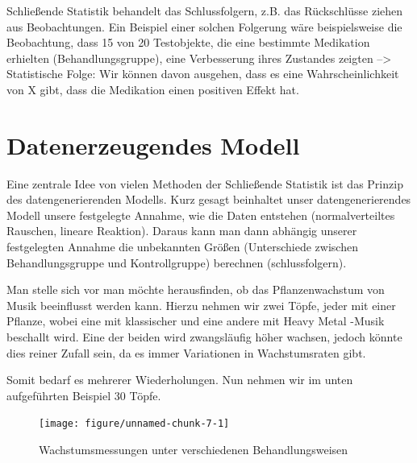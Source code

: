 \documentclass[a4paper,twoside]{tufte-book}\usepackage[]{graphicx}\usepackage[]{color}
\begin{document}

Schließende Statistik behandelt das Schlussfolgern, z.B. das Rückschlüsse ziehen aus Beobachtungen. Ein Beispiel einer solchen Folgerung wäre beispielsweise die Beobachtung, dass 15 von 20 Testobjekte, die eine bestimmte Medikation erhielten (Behandlungsgruppe), eine Verbesserung ihres Zustandes zeigten --> Statistische Folge: Wir können davon ausgehen, dass es eine Wahrscheinlichkeit von X gibt, dass die Medikation einen positiven Effekt hat.


\section{Datenerzeugendes Modell}


Eine zentrale Idee von vielen Methoden der Schließende Statistik ist das Prinzip des datengenerierenden Modells. Kurz gesagt beinhaltet unser datengenerierendes Modell unsere festgelegte Annahme, wie die Daten entstehen (normalverteiltes Rauschen, lineare Reaktion). Daraus kann man dann abhängig unserer festgelegten Annahme die unbekannten Größen (Unterschiede zwischen Behandlungsgruppe und Kontrollgruppe) berechnen (schlussfolgern).


Man stelle sich vor man möchte herausfinden, ob das Pflanzenwachstum von Musik beeinflusst werden kann. Hierzu nehmen wir zwei Töpfe, jeder mit einer Pflanze, wobei eine mit klassischer und eine andere mit Heavy Metal -Musik beschallt wird. Eine der beiden wird zwangsläufig höher wachsen, jedoch könnte dies reiner Zufall sein, da es immer Variationen in Wachstumsraten gibt.

Somit bedarf es mehrerer Wiederholungen. Nun nehmen wir im unten aufgeführten Beispiel 30 Töpfe.


\begin{figure}[htbp]
\begin{center}
\begin{Schunk}

\texttt{[image: figure/unnamed-chunk-7-1]} \end{Schunk}
\caption{Wachstumsmessungen unter verschiedenen Behandlungsweisen}\label{fig: plant growth music}
\end{center}
\end{figure}
\end{document}
